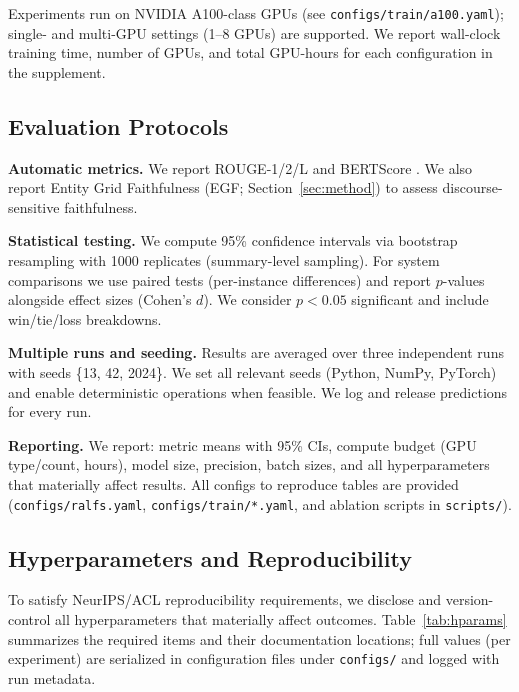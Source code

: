 \documentclass[11pt,a4paper]{article}
\begin{document}
Experiments run on NVIDIA A100-class GPUs (see \texttt{configs/train/a100.yaml}); single- and multi-GPU settings (1--8 GPUs) are supported. We report wall-clock training time, number of GPUs, and total GPU-hours for each configuration in the supplement.

\subsection{Evaluation Protocols}

\textbf{Automatic metrics.} We report ROUGE-1/2/L \cite{lin2004rouge} and BERTScore \cite{zhang2019bertscore}. We also report Entity Grid Faithfulness (EGF; Section~\ref{sec:method}) to assess discourse-sensitive faithfulness.

\textbf{Statistical testing.} We compute 95\% confidence intervals via bootstrap resampling with 1000 replicates (summary-level sampling). For system comparisons we use paired tests (per-instance differences) and report $p$-values alongside effect sizes (Cohen's $d$). We consider $p<0.05$ significant and include win/tie/loss breakdowns.

\textbf{Multiple runs and seeding.} Results are averaged over three independent runs with seeds \{13, 42, 2024\}. We set all relevant seeds (Python, NumPy, PyTorch) and enable deterministic operations when feasible. We log and release predictions for every run.

\textbf{Reporting.} We report: metric means with 95\% CIs, compute budget (GPU type/count, hours), model size, precision, batch sizes, and all hyperparameters that materially affect results. All configs to reproduce tables are provided (\texttt{configs/ralfs.yaml}, \texttt{configs/train/*.yaml}, and ablation scripts in \texttt{scripts/}).

\subsection{Hyperparameters and Reproducibility}

To satisfy NeurIPS/ACL reproducibility requirements, we disclose and version-control all hyperparameters that materially affect outcomes. Table~\ref{tab:hparams} summarizes the required items and their documentation locations; full values (per experiment) are serialized in configuration files under \texttt{configs/} and logged with run metadata.
\end{document}
